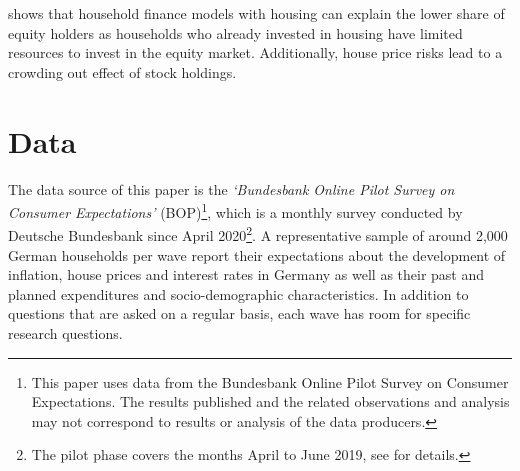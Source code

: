 \documentclass[ProjectABM]{subfiles}
\begin{document}
\cite{cocco2005housing} shows that household finance models with housing can explain the lower share of equity holders as households who already invested in housing have limited resources to invest in the equity market. Additionally, house price risks lead to a crowding out effect of stock holdings.







\section{Data}\label{sec:data}

The data source of this paper is the \textit{`Bundesbank Online Pilot Survey on Consumer Expectations'} (BOP)\footnote{This paper uses data from the Bundesbank Online Pilot Survey on Consumer Expectations. The results published and the related observations and analysis may not correspond to results or analysis of the data producers.}, which is a monthly survey conducted by Deutsche Bundesbank since April 2020\footnote{The pilot phase covers the months April to June 2019, see \cite{bundesbank_2020} for details.}. A representative sample of around 2,000 German households per wave report their expectations about the development of inflation, house prices and interest rates in Germany as well as their past and planned expenditures and socio-demographic characteristics. In addition to questions that are asked on a regular basis, each wave has room for specific research questions.
\end{document}
